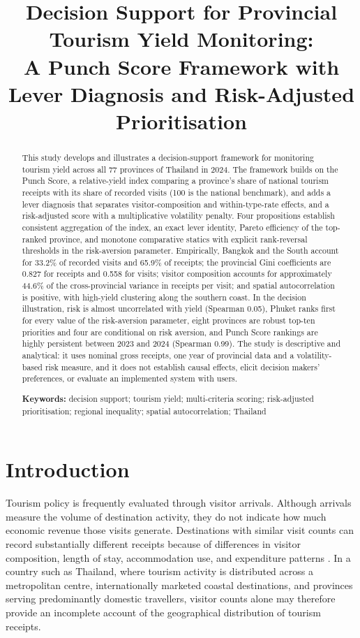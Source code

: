 \documentclass[11pt,a4paper]{article}
\title{Decision Support for Provincial Tourism Yield Monitoring:\\ A Punch Score Framework with Lever Diagnosis and Risk-Adjusted Prioritisation}
\date{}
\theoremstyle{plain}\newtheorem{proposition}{Proposition}
\theoremstyle{definition}\newtheorem{definition}{Definition}
\begin{document}
\maketitle

\begin{abstract}
\noindent This study develops and illustrates a decision-support framework for monitoring tourism yield across all 77 provinces of Thailand in 2024. The framework builds on the Punch Score, a relative-yield index comparing a province's share of national tourism receipts with its share of recorded visits (100 is the national benchmark), and adds a lever diagnosis that separates visitor-composition and within-type-rate effects, and a risk-adjusted score with a multiplicative volatility penalty. Four propositions establish consistent aggregation of the index, an exact lever identity, Pareto efficiency of the top-ranked province, and monotone comparative statics with explicit rank-reversal thresholds in the risk-aversion parameter. Empirically, Bangkok and the South account for 33.2\% of recorded visits and 65.9\% of receipts; the provincial Gini coefficients are 0.827 for receipts and 0.558 for visits; visitor composition accounts for approximately 44.6\% of the cross-provincial variance in receipts per visit; and spatial autocorrelation is positive, with high-yield clustering along the southern coast. In the decision illustration, risk is almost uncorrelated with yield (Spearman 0.05), Phuket ranks first for every value of the risk-aversion parameter, eight provinces are robust top-ten priorities and four are conditional on risk aversion, and Punch Score rankings are highly persistent between 2023 and 2024 (Spearman 0.99). The study is descriptive and analytical: it uses nominal gross receipts, one year of provincial data and a volatility-based risk measure, and it does not establish causal effects, elicit decision makers' preferences, or evaluate an implemented system with users.

\medskip\noindent\textbf{Keywords:} decision support; tourism yield; multi-criteria scoring; risk-adjusted prioritisation; regional inequality; spatial autocorrelation; Thailand
\end{abstract}

\section{Introduction}
Tourism policy is frequently evaluated through visitor arrivals. Although arrivals measure the volume of destination activity, they do not indicate how much economic revenue those visits generate. Destinations with similar visit counts can record substantially different receipts because of differences in visitor composition, length of stay, accommodation use, and expenditure patterns \citep{wang2010,brida2013}. In a country such as Thailand, where tourism activity is distributed across a metropolitan centre, internationally marketed coastal destinations, and provinces serving predominantly domestic travellers, visitor counts alone may therefore provide an incomplete account of the geographical distribution of tourism receipts.
\end{document}
